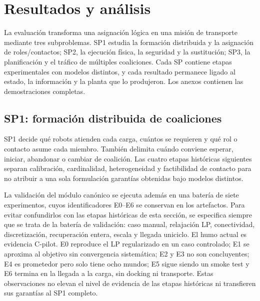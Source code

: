 \section{Resultados y análisis}
\label{sec:results}

La evaluación transforma una asignación lógica en una misión de transporte mediante tres subproblemas. SP1 estudia la formación distribuida y la asignación de roles/contactos; SP2, la ejecución física, la seguridad y la sustitución; SP3, la planificación y el tráfico de múltiples coaliciones. Cada SP contiene etapas experimentales con modelos distintos, y cada resultado permanece ligado al estado, la información y la planta que lo produjeron. Los anexos contienen las demostraciones completas.

\subsection{SP1: formación distribuida de coaliciones}
\label{subsec:sp1}

SP1 decide qué robots atienden cada carga, cuántos se requieren y qué rol o contacto asume cada miembro. También delimita cuándo conviene esperar, iniciar, abandonar o cambiar de coalición. Las cuatro etapas históricas siguientes separan calibración, cardinalidad, heterogeneidad y factibilidad de contacto para no atribuir a una sola formulación garantías obtenidas bajo modelos distintos.

La validación del módulo canónico se ejecuta además en una batería de siete
experimentos, cuyos identificadores E0--E6 se conservan en los artefactos. Para
evitar confundirlos con las etapas históricas de esta sección, se especifica
siempre que se trata de la batería de validación: caso manual, relajación LP,
conectividad, discretización, recuperación entera, escala y llegada uniciclo.
El humo actual es evidencia C-pilot. E0 reproduce el LP regularizado en un caso
controlado; E1 se aproxima al objetivo sin convergencia sistemática; E2 y E3 no
son concluyentes; E4 es prometedor pero solo tiene ocho mundos; E5 sigue siendo
un smoke test y E6 termina en la llegada a la carga, sin docking ni transporte.
Estas observaciones no elevan el nivel de evidencia de las etapas históricas ni
transfieren sus garantías al SP1 completo.






